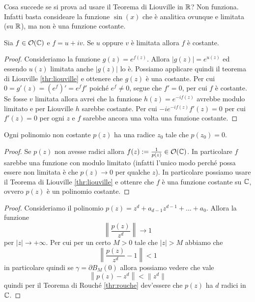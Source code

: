 \begin{remark}
	Cosa succede se si prova ad usare il Teorema di Liouville in $\mathbb{R}$? 
	Non funziona. Infatti basta consideare la funzione $\sin(x)$ che è 
	analitica ovunque e limitata (su $\mathbb{R}$), ma non è una funzione costante. 
\end{remark}

\begin{corollary}
  Sia $f \in \mathcal{O}(\mathbb{C})$ e $f = u + iv$. Se $u$ oppure $v$ è limitata
  allora $f$ è costante.
  \label{cor:stronger-liouville-constant-function}
\end{corollary}
\begin{proof}
  Consideriamo la funzione $g(z) = e^{f(z)}$. Allora $|g(z)| = e^{u(z)}$ ed
  essendo $u(z)$ limitata anche $|g(z)|$ lo è. Possiamo applicare quindi il
  teorema di Liouville \ref{thr:liouville} e ottenere che $g(z)$ è una
  costante. Per cui $0 = g'(z) = (e^f)' = e^f f'$ poiché $e^f \neq 0$, segue
  che $f' = 0$, per cui $f$ è costante.\\
  
  Se fosse $v$ limitata allora avrei che la funzione $h(z) = e^{-if(z)}$
  avrebbe modulo limitato e per Liouville $h$ sarebbe costante. Per cui
  $-i e^{-if(z)} f'(z) = 0$ per cui $f'(z) = 0$ per ogni $z$ e $f$ sarebbe
  ancora una volta una funzione costante.
\end{proof}

\begin{theorem}
  Ogni polinomio non costante $p(z)$ ha una radice $z_0$ tale che $p(z_0)
  = 0$. 
  \label{thr:fondamentale-dell-algebra}
\end{theorem}
\begin{proof}
  Se $p(z)$ non avesse radici allora $f(z) := \frac{1}{p(z)} \in
  \mathcal{O}(\mathbb{C})$. In particolare $f$ sarebbe una funzione con modulo
  limitato (infatti l'unico modo perché possa essere non limitata è che
  $p(z) \to 0$ per qualche $z$). In particolare possiamo usare il Teorema di
  Liouville \ref{thr:liouville} e ottenre che $f$ è una funzione costante su
  $\mathbb{C}$, ovvero $p(z)$ è un polinomio costante.
\end{proof}
\begin{proof}
  Consideriamo il polinomio $p(z) = z^d + a_{d-1}z^{d-1} + \dots + a_0$. 
  Allora la funzione 
  \begin{equation*}
  		\left\| \frac{p(z)}{z^d} \right\| \to 1
  \end{equation*}
  per $|z| \to +\infty$. Per cui per un certo $M > 0$ tale che $|z| > M$ 
  abbiamo che
  \begin{equation*}
	  	\left\|\frac{p(z)}{z^d} - 1\right\| < 1
  \end{equation*} 
  in particolare quindi se $\gamma = \partial B_M(0)$ allora possiamo vedere 
  che vale 
  \begin{equation*}
	  \left\|p(z) - z^d\right\| < \|z^d\|
  \end{equation*} 
  quindi per il Teorema di Rouché \ref{thr:rouche} dev'essere che $p(z)$ ha 
  $d$ radici in $\mathbb{C}$.
\end{proof}

